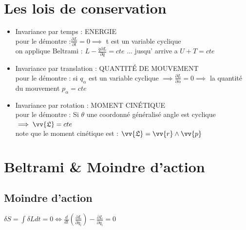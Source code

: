 \documentclass[12pt,oneside]{book}
\begin{document}
\section{Les lois de conservation }
\begin{itemize}
	\item Invariance par temps : ENERGIE
	      \\ pour le démontre :$ \frac{\partial L}{\partial t} = 0 \implies   $ t est un variable cyclique \\
	      on applique Beltrami : $ L - \frac{\dot{q}\partial L}{\partial \dot{q}} = cte $ ... jusqu' arrive a $  U + T = cte$
	\item Invariance par translation  : QUANTITÉ DE MOUVEMENT 
	      \\ pour le démontre : si $ q_\alpha $ est un variable cyclique $ \implies \frac{\partial L}{\partial \alpha} = 0 \implies   $ la quantité du mouvement $ p_\alpha = cte $
	\item Invariance par rotation : MOMENT CINÉTIQUE  \\
	      pour le démontre : Si $ \theta  $ une coordonné généralisé angle est cyclique $ \implies \vv{\mathfrak{L}} = cte  $ \\
	      note que le moment cinétique est : $ \vv{\mathfrak{L}} = \vv{r} \wedge \vv{p} $
\end{itemize}
\section{Beltrami \& Moindre d'action}
\subsection{Moindre d'action}
$ \delta S = \int \delta L dt =0 \Longleftrightarrow \frac{d}{dt}(\frac{\partial L}{\partial \dot{q_i}}) - \frac{\partial L}{\partial q_i} =0  $
\end{document}

